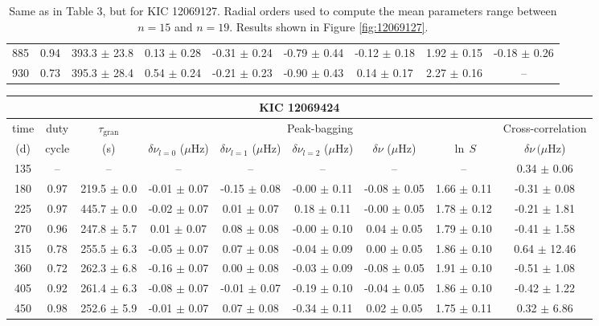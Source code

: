 \documentclass[twocolumn]{aastex61}%
\begin{document}
\begin{table*}[ht]
\begin{tabular}{ccc|ccccc|c}
885 & 0.94 & 393.3 $\pm$ 23.8 & 0.13 $\pm$ 0.28 & -0.31 $\pm$ 0.24 & -0.79 $\pm$ 0.44 & -0.12 $\pm$ 0.18 & 1.92 $\pm$ 0.15 & -0.18 $\pm$ 0.26\\
930 & 0.73 & 395.3 $\pm$ 28.4 & 0.54 $\pm$ 0.24 & -0.21 $\pm$ 0.23 & -0.90 $\pm$ 0.43 & 0.14 $\pm$ 0.17 & 2.27 $\pm$ 0.16 & --\\
\end{tabular}
\caption{Same as in Table 3, but for KIC 12069127. Radial orders used to compute the mean parameters range between $n=15$ and $n=19$. Results shown in Figure \ref{fig:12069127}.}\label{tab:12069127}
\end{table*}

\begin{table*}[ht]\centering\fontsize{9.}{7.}\selectfont
\begin{tabular}{ccc|ccccc|c}
\multicolumn{9}{c}{KIC 12069424}\\ \hline\hline
time & duty & $\tau_\text{gran}$ &\multicolumn{5}{c|}{Peak-bagging}&Cross-correlation\\
(d)& cycle & (s)&$\delta\nu_{l=0}$ ($\mu$Hz) & $\delta\nu_{l=1}$ ($\mu$Hz) & $\delta\nu_{l=2}$ ($\mu$Hz) & $\delta\nu$ ($\mu$Hz)& $\ln\,S$ & $\delta\nu\,(\mu$Hz)\\\hline
135 & -- & -- & -- & -- & -- & -- & -- & 0.34 $\pm$ 0.06\\
180 & 0.97 & 219.5 $\pm$ 0.0 & -0.01 $\pm$ 0.07 & -0.15 $\pm$ 0.08 & -0.00 $\pm$ 0.11 & -0.08 $\pm$ 0.05 & 1.66 $\pm$ 0.11 & -0.31 $\pm$ 0.08\\
225 & 0.97 & 445.7 $\pm$ 0.0 & -0.02 $\pm$ 0.07 & 0.01 $\pm$ 0.07 & 0.18 $\pm$ 0.11 & -0.00 $\pm$ 0.05 & 1.78 $\pm$ 0.12 & -0.21 $\pm$ 1.81\\
270 & 0.96 & 247.8 $\pm$ 5.7 & 0.01 $\pm$ 0.07 & 0.08 $\pm$ 0.08 & -0.00 $\pm$ 0.10 & 0.04 $\pm$ 0.05 & 1.79 $\pm$ 0.10 & -0.41 $\pm$ 1.58\\
315 & 0.78 & 255.5 $\pm$ 6.3 & -0.05 $\pm$ 0.07 & 0.07 $\pm$ 0.08 & -0.04 $\pm$ 0.09 & 0.00 $\pm$ 0.05 & 1.86 $\pm$ 0.10 & 0.64 $\pm$ 12.46\\
360 & 0.72 & 262.3 $\pm$ 6.8 & -0.16 $\pm$ 0.07 & 0.00 $\pm$ 0.08 & -0.03 $\pm$ 0.09 & -0.08 $\pm$ 0.05 & 1.91 $\pm$ 0.10 & -0.51 $\pm$ 1.08\\
405 & 0.92 & 261.4 $\pm$ 6.3 & -0.08 $\pm$ 0.07 & -0.01 $\pm$ 0.07 & -0.19 $\pm$ 0.10 & -0.04 $\pm$ 0.05 & 1.86 $\pm$ 0.10 & -0.42 $\pm$ 1.22\\
450 & 0.98 & 252.6 $\pm$ 5.9 & -0.01 $\pm$ 0.07 & 0.07 $\pm$ 0.08 & -0.34 $\pm$ 0.11 & 0.02 $\pm$ 0.05 & 1.75 $\pm$ 0.11 & 0.32 $\pm$ 6.86\\

\end{tabular}
\end{table*}
\end{document}
